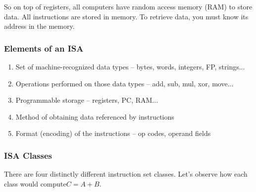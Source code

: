 \documentclass{article}
\begin{document}
So on top of registers, all computers have random access memory  (RAM) to store data. All instructions are stored in memory. To retrieve data, you must know its address in the memory. 

\subsubsection{Elements of an ISA}

\begin{enumerate}

\item Set of machine-recognized data types -- bytes, words, integers, FP, strings...

\item Operations performed on those data types -- add, sub, mul, xor, move...

\item Programmable storage -- registers, PC, RAM...

\item Method of obtaining data referenced by instructions

\item Format (encoding) of the instructions -- op codes, operand fields

\end{enumerate}


\subsubsection{ISA Classes}

There are four distinctly different instruction set classes. Let's observe how each class would compute$C = A + B$.
\end{document}
